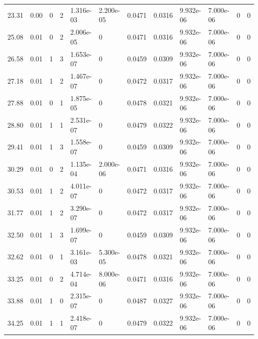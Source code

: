\documentclass[preview]{standalone}
\begin{document}
{{\begin{tabular}{L{1.2cm}C{1.2cm} C{0.3cm}C{0.5cm} C{1.4cm}C{1.4cm} C{1.4cm}C{1.4cm} C{1.6cm}C{1.6cm} C{1.6cm}C{1.6cm}}
  23.31  &  0.00  & 0     &  2 &  1.316e-03  & 2.200e-05  &  0.0471&   0.0316& 9.932e-06 & 7.000e-06   &  0 & 0  \\ 
  25.08  &  0.01  & 0     &  2 &  2.006e-05  & 0  &  0.0471&   0.0316& 9.932e-06 & 7.000e-06   &  0 & 0  \\ 
  26.58  &  0.01  & 1     &  3 &  1.653e-07  & 0  &  0.0459&   0.0309& 9.932e-06 & 7.000e-06   &  0 & 0  \\ 
  27.18  &  0.01  & 1     &  2 &  1.467e-07  & 0  &  0.0472&   0.0317& 9.932e-06 & 7.000e-06   &  0 & 0  \\ 
  27.88  &  0.01  & 0     &  1 &  1.875e-05  & 0  &  0.0478&   0.0321& 9.932e-06 & 7.000e-06   &  0 & 0  \\ 
  28.80  &  0.01  & 1     &  1 &  2.531e-07  & 0  &  0.0479&   0.0322& 9.932e-06 & 7.000e-06   &  0 & 0  \\ 
  29.41  &  0.01  & 1     &  3 &  1.558e-07  & 0  &  0.0459&   0.0309& 9.932e-06 & 7.000e-06   &  0 & 0  \\ 
  30.29  &  0.01  & 0     &  2 &  1.135e-04  & 2.000e-06  &  0.0471&   0.0316& 9.932e-06 & 7.000e-06   &  0 & 0  \\ 
  30.53  &  0.01  & 1     &  2 &  4.011e-07  & 0  &  0.0472&   0.0317& 9.932e-06 & 7.000e-06   &  0 & 0  \\ 
  31.77  &  0.01  & 1     &  2 &  3.290e-07  & 0  &  0.0472&   0.0317& 9.932e-06 & 7.000e-06   &  0 & 0  \\ 
  32.50  &  0.01  & 1     &  3 &  1.699e-07  & 0  &  0.0459&   0.0309& 9.932e-06 & 7.000e-06   &  0 & 0  \\ 
  32.62  &  0.01  & 0     &  1 &  3.161e-03  & 5.300e-05  &  0.0478&   0.0321& 9.932e-06 & 7.000e-06   &  0 & 0  \\ 
  33.25  &  0.01  & 0     &  2 &  4.714e-04  & 8.000e-06  &  0.0471&   0.0316& 9.932e-06 & 7.000e-06   &  0 & 0  \\ 
  33.88  &  0.01  & 1     &  0 &  2.315e-07  & 0  &  0.0487&   0.0327& 9.932e-06 & 7.000e-06   &  0 & 0  \\ 
  34.25  &  0.01  & 1     &  1 &  2.418e-07  & 0  &  0.0479&   0.0322& 9.932e-06 & 7.000e-06   &  0 & 0  \\ 
\hline 
\end{tabular} 

}}
\end{document}
